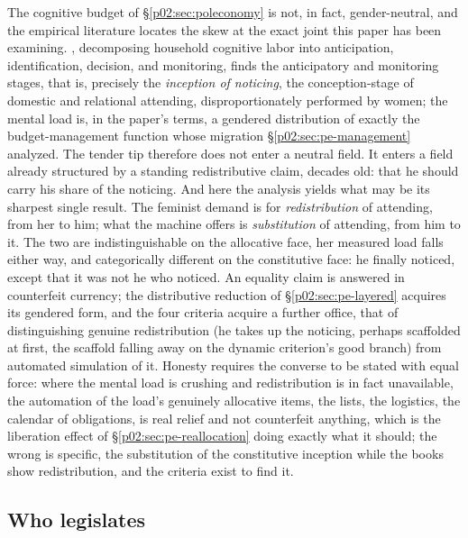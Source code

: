 The cognitive budget of \S\ref{p02:sec:poleconomy} is not, in fact, gender-neutral, and the empirical literature locates the skew at the exact joint this paper has been examining. \textcite{daminger2019cognitive}, decomposing household cognitive labor into anticipation, identification, decision, and monitoring, finds the anticipatory and monitoring stages, that is, precisely the \emph{inception of noticing}, the conception-stage of domestic and relational attending, disproportionately performed by women; the mental load is, in the paper's terms, a gendered distribution of exactly the budget-management function whose migration \S\ref{p02:sec:pe-management} analyzed. The tender tip therefore does not enter a neutral field. It enters a field already structured by a standing redistributive claim, decades old: that he should carry his share of the noticing. And here the analysis yields what may be its sharpest single result. The feminist demand is for \emph{redistribution} of attending, from her to him; what the machine offers is \emph{substitution} of attending, from him to it. The two are indistinguishable on the allocative face, her measured load falls either way, and categorically different on the constitutive face: he finally noticed, except that it was not he who noticed. An equality claim is answered in counterfeit currency; the distributive reduction of \S\ref{p02:sec:pe-layered} acquires its gendered form, and the four criteria acquire a further office, that of distinguishing genuine redistribution (he takes up the noticing, perhaps scaffolded at first, the scaffold falling away on the dynamic criterion's good branch) from automated simulation of it. Honesty requires the converse to be stated with equal force: where the mental load is crushing and redistribution is in fact unavailable, the automation of the load's genuinely allocative items, the lists, the logistics, the calendar of obligations, is real relief and not counterfeit anything, which is the liberation effect of \S\ref{p02:sec:pe-reallocation} doing exactly what it should; the wrong is specific, the substitution of the constitutive inception while the books show redistribution, and the criteria exist to find it.

\subsection{Who legislates}
\label{p02:sec:fem-legislates}

